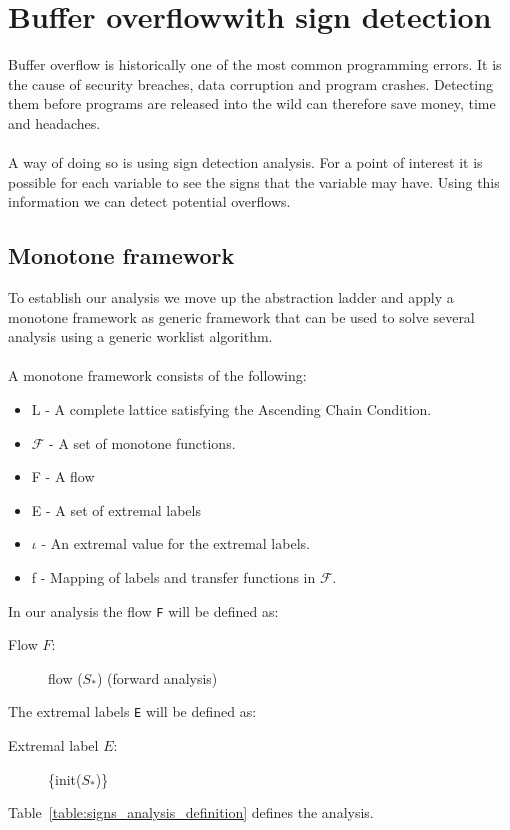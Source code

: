 {\setlength{\chapterfontsize}{24pt}
\chapter{Buffer overflowwith sign detection}
}\label{sec:exercise3}Buffer overflow is historically one of the most common programming errors. It is the cause of security breaches, data corruption and program crashes. Detecting them before programs are released into the wild can therefore save money, time and headaches.
\\\\
A way of doing so is using sign detection analysis. For a point of interest it is possible for each variable to see the signs that the variable may have. Using this information we can detect potential overflows.

\section{Monotone framework}
To establish our analysis we move up the abstraction ladder and apply a monotone framework as generic framework that can be used to solve several analysis using a generic worklist algorithm.
\\\\
A monotone framework consists of the following:
\begin{itemize}
	\item L - A complete lattice satisfying the Ascending Chain Condition.
	\item $\mathcal{F}$ - A set of monotone functions.
	\item F - A flow
	\item E - A set of extremal labels
	\item $\iota$ - An extremal value for the extremal labels.
	\item f - Mapping of labels and transfer functions in $\mathcal{F}$.
\end{itemize}
In our analysis the flow \texttt{F} will be defined as:
\begin{description}
  \item[Flow $F$:] flow ($S_*$) (forward analysis)
\end{description}
The extremal labels \texttt{E} will be defined as:
\begin{description}
    \item[Extremal label $E$:] \{init($S_*$)\}
\end{description}
\noindent Table~\ref{table:signs_analysis_definition} defines the analysis.
